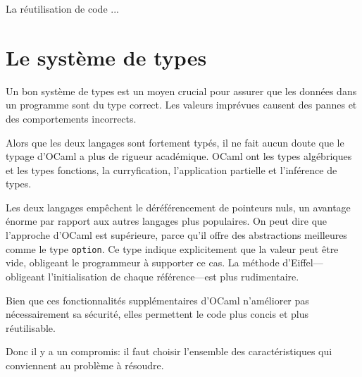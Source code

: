 \documentclass[french]{report}
\begin{document}
La réutilisation de code ...

\section{Le système de types}

Un bon système de types est un moyen crucial pour assurer que les données dans un programme sont du type correct. Les valeurs imprévues causent des pannes et des comportements incorrects.

Alors que les deux langages sont fortement typés, il ne fait aucun doute que le typage d'OCaml a plus de rigueur académique. OCaml ont les types algébriques et les types fonctions, la curryfication, l'application partielle et l'inférence de types.

Les deux langages empêchent le déréférencement de pointeurs nuls, un avantage énorme par rapport aux autres langages plus populaires. On peut dire que l'approche d'OCaml est supérieure, parce qu'il offre des abstractions meilleures comme le type \texttt{option}. Ce type indique explicitement que la valeur peut être vide, obligeant le programmeur à supporter ce cas. La méthode d'Eiffel---obligeant l'initialisation de chaque référence---est plus rudimentaire.

Bien que ces fonctionnalités supplémentaires d'OCaml n'améliorer pas nécessairement sa sécurité, elles permettent le code plus concis et plus réutilisable.

Donc il y a un compromis: il faut choisir l'ensemble des caractéristiques qui conviennent au problème à résoudre.
\end{document}
